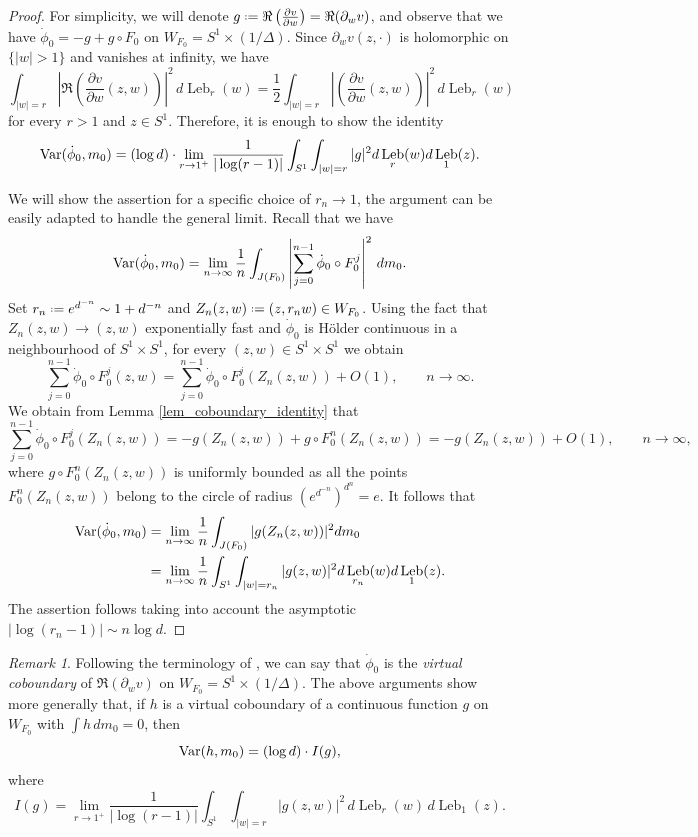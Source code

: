 \documentclass[11pt]{amsart}
\theoremstyle{plain}
\theoremstyle{definition}
\theoremstyle{remark}
\newtheorem{rmk}[thm]{Remark}
\newcommand*{\defeq}{\mathrel{\vcenter{\baselineskip0.5ex \lineskiplimit0pt
			\hbox{\scriptsize.}\hbox{\scriptsize.}}}%
	=}
\DeclareMathOperator{\Leb}{Leb}
\begin{document}
\begin{proof}
For simplicity, we will denote $g \defeq\Re \left(\frac{\partial v}{\partial w}\right)= \Re ( \partial_w v)$,
 and observe that
we have $\dot \phi_0 =- g + g\circ F_0$ on $W_{F_0} =S^1\times (1/\Delta)$.
Since $\partial_w v(z,\cdot)$ is holomorphic on $\{|w|>1\}$ and vanishes at
infinity, we have
\[
\int_{|w|=r}
\left|\Re
\left(\frac{\partial v}{\partial w} (z,w)\right)
\right|^2\,d\Leb_r(w)
=\frac12\int_{|w|=r}\left|
\left(\frac{\partial v}{\partial w} (z,w)\right)
\right|^2\,d\Leb_r (w)
\]
for every $r>1$ and  $z\in S^1$.
 Therefore,
it is enough to show the
identity
\[
{\rm Var}(\dot\phi_0,m_0)
=
(\log d) \cdot
\lim_{r \to 1^+} \frac{1}{|\log(r-1)|}
 \int_{S^1}\int_{|w|=r}
|g|^2
d\Leb_r 
(w)
d\Leb_1 (z).
\]

We will show the assertion for a specific choice of $r_n\to 1$, the argument can be easily
adapted
to handle the general limit.
Recall that we have 
\[
{\rm Var} (\dot\phi_0,m_0) = \lim_{n\to \infty}
\frac{1}{n}
\int_{J(F_0)}
\left|
 \sum_{j=0}^{n-1} \dot \phi_0 \circ F_0^j\right|^2\,d m_0.
\]
Set
 $r_n\defeq e^{d^{-n}}\sim 1+ d^{-n}$
 and $Z_n(z,w)\defeq(z,r_n w)\in W_{F_0}$.
 Using the fact that $Z_n(z,w)\to(z,w)$ exponentially
  fast and
  $\dot \phi_0$ is H\"older continuous
  in a neighbourhood of $S^1\times S^1$,
   for every
 $(z,w)\in S^1\times S^1$
 we obtain
\[
 \sum_{j=0}^{n-1}
 \dot \phi_0 \circ F_0^j (z,w)
 =
 \sum_{j=0}^{n-1}
 \dot \phi_0 \circ F^j_0 (Z_n (z,w))
  + O(1), \qquad n\to \infty.
\]
We obtain
from Lemma \ref{lem_coboundary_identity} that
\[
\sum_{j=0}^{n-1}
\dot \phi_0 \circ F_0^j ( Z_n (z,w))
=-g(Z_n(z,w))
+
g\circ F_0^{n} (Z_n(z,w))
=-g(Z_n(z,w))
+O(1), \qquad n\to \infty,
\]
where 
 $g\circ F^{n}_0 (Z_n(z,w))$
 is uniformly bounded as all the points 
 $F^{n}_0 (Z_n(z,w))$ belong to the circle of radius
  $(e^{d^{-n}})^{d^n}=e$.
  It follows that
\[\begin{aligned}
{\rm Var} (\dot\phi_0,m_0) & =  \lim_{n\to \infty}
\frac{1}{n}
\int_{J(F_0)}
|g(Z_n(z,w))
|^2 
dm_0
\\ &=
 \lim_{n\to \infty}
\frac{1}{n}
\int_{S^1}
\int_{|w|=r_n}
|g (z,w)
|^2
d\Leb_{r_n} (w)
 d\Leb_1(z).
\end{aligned}
\]
The assertion follows taking into account the asymptotic
$|\log(r_n-1)|\sim n\log d$.
\end{proof}



\begin{rmk}
Following the terminology of \cite{McMullen08}, we can
 say that 
$\dot \phi_0$ is the \emph{virtual coboundary} of 
$\Re (\partial_w v)$
on $W_{F_0}=S^1\times (1/\Delta)$.
The above arguments show more generally that, if 
 $h$ is a
 virtual coboundary of a continuous function $g$
 on $W_{F_0}$ with
$\int h\,dm_0=0$,
then
\[
{\rm Var}(h,m_0)=(\log d)\cdot I(g),
\]
where
\[
I(g)=
\lim_{r\to 1^+}
\frac{1}{|\log(r-1)|}
\int_{S^1}
\int_{|w|=r}|g(z,w)|^2\,
d\Leb_{r} (w)
\,
d\Leb_1 (z).
\]
\end{rmk}
\end{document}
